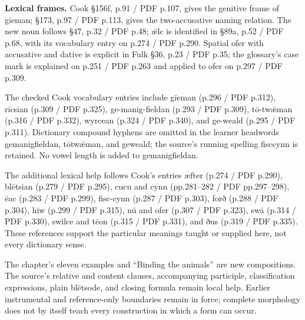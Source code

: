 \textbf{Lexical frames.} Cook §156f, p.91 /\allowbreak{} PDF p.107, gives the genitive frame of gīeman; §173, p.97 /\allowbreak{} PDF p.113, gives the two-accusative naming relation. The new noun follows §47, p.32 /\allowbreak{} PDF p.48; ǣlc is identified in §89a, p.52 /\allowbreak{} PDF p.68, with its vocabulary entry on p.274 /\allowbreak{} PDF p.290. Spatial ofer with accusative and dative is explicit in Fulk §36, p.23 /\allowbreak{} PDF p.35; the glossary’s case mark is explained on p.251 /\allowbreak{} PDF p.263 and applied to ofer on p.297 /\allowbreak{} PDF p.309.

The checked Cook vocabulary entries include gīeman (p.296 /\allowbreak{} PDF p.312), rīcsian (p.309 /\allowbreak{} PDF p.325), ge-manig-fieldan (p.293 /\allowbreak{} PDF p.309), tō-twǣman (p.316 /\allowbreak{} PDF p.332), wyrcean (p.324 /\allowbreak{} PDF p.340), and ge-weald (p.295 /\allowbreak{} PDF p.311). Dictionary compound hyphens are omitted in the learner headwords gemanigfieldan, tōtwǣman, and geweald; the source’s running spelling fisccynn is retained. No vowel length is added to gemanigfieldan.

The additional lexical help follows Cook’s entries æfter (p.274 /\allowbreak{} PDF p.290), blētsian (p.279 /\allowbreak{} PDF p.295), cucu and cynn (pp.281–282 /\allowbreak{} PDF pp.297–298), ēac (p.283 /\allowbreak{} PDF p.299), fisc-cynn (p.287 /\allowbreak{} PDF p.303), forð (p.288 /\allowbreak{} PDF p.304), hīw (p.299 /\allowbreak{} PDF p.315), nū and ofer (p.307 /\allowbreak{} PDF p.323), swā (p.314 /\allowbreak{} PDF p.330), swilce and tēon (p.315 /\allowbreak{} PDF p.331), and ðus (p.319 /\allowbreak{} PDF p.335). These references support the particular meanings taught or supplied here, not every dictionary sense.

The chapter’s eleven examples and “Binding the animals” are new compositions. The source’s relative and content clauses, accompanying participle, classification expressions, plain blētsode, and closing formula remain local help. Earlier instrumental and reference-only boundaries remain in force; complete morphology does not by itself teach every construction in which a form can occur.

\endgroup

\par\label{end-ch07-learner}
\clearpage\endgroup
